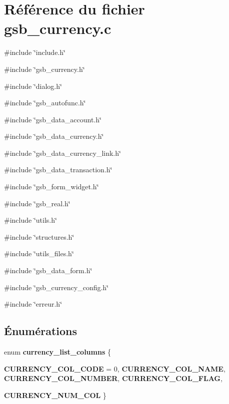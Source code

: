 \section{Référence du fichier gsb\_\-currency.c}
\label{gsb__currency_8c}
{\ttfamily \#include \char`\"{}include.h\char`\"{}}\par
{\ttfamily \#include \char`\"{}gsb\_\-currency.h\char`\"{}}\par
{\ttfamily \#include \char`\"{}dialog.h\char`\"{}}\par
{\ttfamily \#include \char`\"{}gsb\_\-autofunc.h\char`\"{}}\par
{\ttfamily \#include \char`\"{}gsb\_\-data\_\-account.h\char`\"{}}\par
{\ttfamily \#include \char`\"{}gsb\_\-data\_\-currency.h\char`\"{}}\par
{\ttfamily \#include \char`\"{}gsb\_\-data\_\-currency\_\-link.h\char`\"{}}\par
{\ttfamily \#include \char`\"{}gsb\_\-data\_\-transaction.h\char`\"{}}\par
{\ttfamily \#include \char`\"{}gsb\_\-form\_\-widget.h\char`\"{}}\par
{\ttfamily \#include \char`\"{}gsb\_\-real.h\char`\"{}}\par
{\ttfamily \#include \char`\"{}utils.h\char`\"{}}\par
{\ttfamily \#include \char`\"{}structures.h\char`\"{}}\par
{\ttfamily \#include \char`\"{}utils\_\-files.h\char`\"{}}\par
{\ttfamily \#include \char`\"{}gsb\_\-data\_\-form.h\char`\"{}}\par
{\ttfamily \#include \char`\"{}gsb\_\-currency\_\-config.h\char`\"{}}\par
{\ttfamily \#include \char`\"{}erreur.h\char`\"{}}\par
\subsection*{Énumérations}
\begin{DoxyCompactItemize}
\item 
enum {\bf currency\_\-list\_\-columns} \{ \par
{\bf CURRENCY\_\-COL\_\-CODE} =  0, 
{\bf CURRENCY\_\-COL\_\-NAME}, 
{\bf CURRENCY\_\-COL\_\-NUMBER}, 
{\bf CURRENCY\_\-COL\_\-FLAG}, 
\par
{\bf CURRENCY\_\-NUM\_\-COL}
 \}
\end{DoxyCompactItemize}
